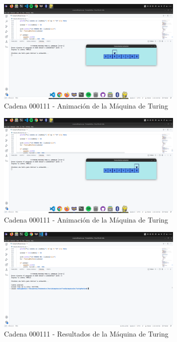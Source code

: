 \documentclass[11pt]{article} %
\begin{document}
	
	\begin{figure}[h]
		\centering
		\includegraphics[width=0.8\textwidth]{manual2}
		\caption{Cadena 000111 - Animación de la Máquina de Turing}
	\end{figure}
	\newpage
	
	
	\begin{figure}[h]
		\centering
		\includegraphics[width=0.8\textwidth]{manual3}
		\caption{Cadena 000111 - Animación de la Máquina de Turing}
	\end{figure}
	
	\begin{figure}[h]
		\centering
		\includegraphics[width=0.8\textwidth]{manual4}
		\caption{Cadena 000111 - Resultados de la Máquina de Turing}
	\end{figure}
	
\end{document}
